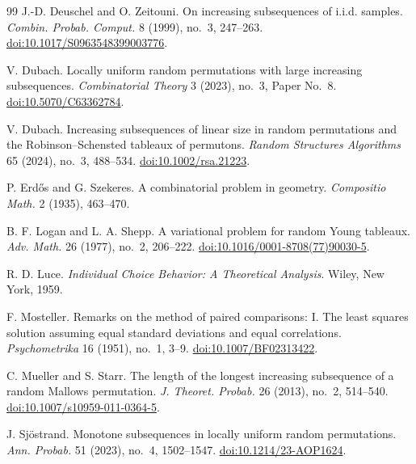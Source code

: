 \documentclass[11pt]{article}
\theoremstyle{remark}
\begin{document}
\begin{thebibliography}{99}
J.-D. Deuschel and O. Zeitouni.
\newblock On increasing subsequences of i.i.d. samples.
\newblock \emph{Combin. Probab. Comput.} 8 (1999), no.~3, 247--263.
\newblock \href{https://doi.org/10.1017/S0963548399003776}
{doi:10.1017/S0963548399003776}.

V. Dubach.
\newblock Locally uniform random permutations with large increasing
subsequences.
\newblock \emph{Combinatorial Theory} 3 (2023), no.~3, Paper No.~8.
\newblock \href{https://doi.org/10.5070/C63362784}
{doi:10.5070/C63362784}.

V. Dubach.
\newblock Increasing subsequences of linear size in random permutations and
the Robinson--Schensted tableaux of permutons.
\newblock \emph{Random Structures Algorithms} 65 (2024), no.~3, 488--534.
\newblock \href{https://doi.org/10.1002/rsa.21223}
{doi:10.1002/rsa.21223}.

P. Erd\H{o}s and G. Szekeres.
\newblock A combinatorial problem in geometry.
\newblock \emph{Compositio Math.} 2 (1935), 463--470.

B. F. Logan and L. A. Shepp.
\newblock A variational problem for random Young tableaux.
\newblock \emph{Adv. Math.} 26 (1977), no.~2, 206--222.
\newblock \href{https://doi.org/10.1016/0001-8708(77)90030-5}
{doi:10.1016/0001-8708(77)90030-5}.

R. D. Luce.
\newblock \emph{Individual Choice Behavior: A Theoretical Analysis}.
\newblock Wiley, New York, 1959.

F. Mosteller.
\newblock Remarks on the method of paired comparisons: I. The least squares
solution assuming equal standard deviations and equal correlations.
\newblock \emph{Psychometrika} 16 (1951), no.~1, 3--9.
\newblock \href{https://doi.org/10.1007/BF02313422}
{doi:10.1007/BF02313422}.

C. Mueller and S. Starr.
\newblock The length of the longest increasing subsequence of a random
Mallows permutation.
\newblock \emph{J. Theoret. Probab.} 26 (2013), no.~2, 514--540.
\newblock \href{https://doi.org/10.1007/s10959-011-0364-5}
{doi:10.1007/s10959-011-0364-5}.

J. Sj\"ostrand.
\newblock Monotone subsequences in locally uniform random permutations.
\newblock \emph{Ann. Probab.} 51 (2023), no.~4, 1502--1547.
\newblock \href{https://doi.org/10.1214/23-AOP1624}
{doi:10.1214/23-AOP1624}.


\end{thebibliography}
\end{document}
